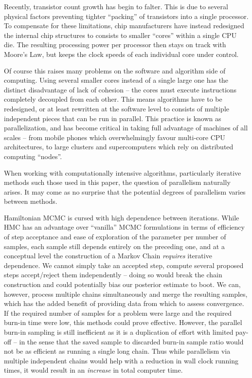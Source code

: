 	Recently, transistor count growth has begin to falter. This is due to several physical factors preventing tighter ``packing'' of transistors into a single processor. To compensate for these limitations, chip manufacturers have instead redesigned the internal chip structures to consists to smaller ``cores'' within a single CPU die. The resulting processing power per processor then stays on track with Moore's Law, but keeps the clock speeds of each individual core under control.

	Of course this raises many problems on the software and algorithm side of computing. Using several smaller cores instead of a single large one has the distinct disadvantage of lack of cohesion -- the cores must execute instructions completely decoupled from each other. This means algorithms have to be redesigned, or at least rewritten at the software level to consists of multiple independent pieces that can be run in parallel. This practice is known as parallelization, and has become critical in taking full advantage of machines of all scales -- from mobile phones which overwhelmingly favour multi-core CPU architectures, to large clusters and supercomputers which rely on distributed computing ``nodes''.

	When working with computationally intensive algorithms, particularly iterative methods such those used in this paper, the question of parallelism naturally arises. It may come as no surprise that the potential degrees of parallelism varies between methods.

	Hamiltonian MCMC is cursed with high dependence between iterations. While HMC has an advantage over ``vanilla'' MCMC formulations in terms of efficiency of step acceptance and ease of exploration of the parameter per number of samples, each sample still depends entirely on the preceding one, and at a conceptual level the construction of a Markov Chain \textit{requires} iterative dependence. We cannot simply take an accepted step, compute several proposed steps accept/reject them independently -- doing so would break the chain construction and could potentially bias our posterior estimate to boot. We can, however, process multiple chains simultaneously and merge the resulting samples, which has the added benefit of providing data from which to assess convergence. If the required number of samples for a problem were large and the required burn-in time were low, this methods could prove effective. However, the parallel burn-in sampling is still inefficient as it is a duplication of effort with limited pay-off -- in the sense that the saved sample to discarded burn-in sample ratio would not be as efficient as running a single long chain. Thus while parallelism via multiple independent chains would help with a reduction in wall clock running times, it would result in an \textit{increase} in total computer time.

